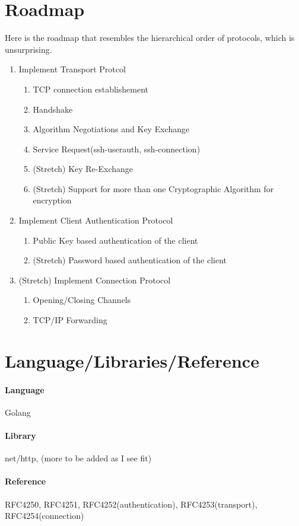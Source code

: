 \documentclass[10pt,sigconf]{acmart}
\begin{document}
\section{Roadmap}

Here is the roadmap that resembles the hierarchical order of protocols, which is unsurprising.
\begin{enumerate}
    \item Implement Transport Protcol 
    \begin{enumerate}
        \item TCP connection establishement
        \item Handshake 
        \item Algorithm Negotiations and Key Exchange
        \item Service Request(ssh-userauth, ssh-connection)
        \item (Stretch) Key Re-Exchange
        \item (Stretch) Support for more than one Cryptographic Algorithm for encryption
    \end{enumerate}
    \item Implement Client Authentication Protocol
    \begin{enumerate}
        \item Public Key based authentication of the client
        \item (Stretch) Password based authentication of the client
    \end{enumerate}
    \item (Stretch) Implement Connection Protocol
    \begin{enumerate}
        \item Opening/Closing Channels
        \item TCP/IP Forwarding
    \end{enumerate}
\end{enumerate}
\section{Language/Libraries/Reference}
\paragraph*{Language}
Golang
\paragraph*{Library}
net/http, (more to be added as I see fit)
\paragraph*{Reference}
RFC4250, RFC4251, RFC4252(authentication), RFC4253(transport), RFC4254(connection)

% 
%  
\end{document}
